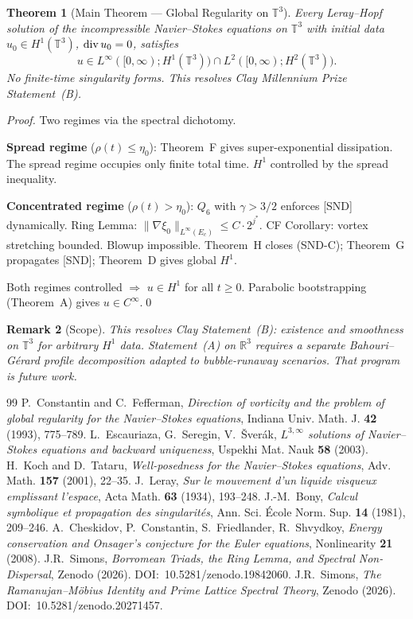 \documentclass[11pt]{article}
\newtheorem{theorem}{Theorem}[section]
\newtheorem{remark}[theorem]{Remark}
\begin{document}
\begin{theorem}[Main Theorem --- Global Regularity on $\mathbb{T}^3$]
Every Leray--Hopf solution of the incompressible Navier--Stokes equations on $\mathbb{T}^3$
with initial data $u_0\in H^1(\mathbb{T}^3)$, ${\rm div}\,u_0=0$, satisfies
\[u\in L^\infty([0,\infty);H^1(\mathbb{T}^3))\cap L^2([0,\infty);H^2(\mathbb{T}^3)).\]
No finite-time singularity forms. This resolves Clay Millennium Prize Statement~(B).
\end{theorem}

\begin{proof}
Two regimes via the spectral dichotomy.

\textbf{Spread regime} ($\rho(t)\leq\eta_0$): Theorem~F gives super-exponential dissipation.
The spread regime occupies only finite total time. $H^1$ controlled by the spread inequality.

\textbf{Concentrated regime} ($\rho(t)>\eta_0$): $Q_6$ with $\gamma>3/2$ enforces [SND] dynamically.
Ring Lemma: $\|\nabla\xi_0\|_{L^\infty(E_c)}\leq C\cdot 2^{j^*}$.
CF Corollary: vortex stretching bounded. Blowup impossible.
Theorem~H closes (SND-C); Theorem~G propagates [SND]; Theorem~D gives global $H^1$.

Both regimes controlled $\Rightarrow$ $u\in H^1$ for all $t\geq 0$.
Parabolic bootstrapping (Theorem~A) gives $u\in C^\infty$.\qed
\end{proof}

\begin{remark}[Scope]
This resolves Clay Statement~(B): existence and smoothness on $\mathbb{T}^3$ for arbitrary $H^1$ data.
Statement~(A) on $\mathbb{R}^3$ requires a separate Bahouri--G\'erard profile decomposition adapted to bubble-runaway scenarios. That program is future work.
\end{remark}

\begin{thebibliography}{99}
 P.~Constantin and C.~Fefferman, \textit{Direction of vorticity and the problem of global regularity for the Navier--Stokes equations}, Indiana Univ. Math. J. \textbf{42} (1993), 775--789.
 L.~Escauriaza, G.~Seregin, V.~\v Sver\'ak, \textit{$L^{3,\infty}$ solutions of Navier--Stokes equations and backward uniqueness}, Uspekhi Mat. Nauk \textbf{58} (2003).
 H.~Koch and D.~Tataru, \textit{Well-posedness for the Navier--Stokes equations}, Adv. Math. \textbf{157} (2001), 22--35.
 J.~Leray, \textit{Sur le mouvement d'un liquide visqueux emplissant l'espace}, Acta Math. \textbf{63} (1934), 193--248.
 J.-M.~Bony, \textit{Calcul symbolique et propagation des singularit\'es}, Ann. Sci. \'Ecole Norm. Sup. \textbf{14} (1981), 209--246.
 A.~Cheskidov, P.~Constantin, S.~Friedlander, R.~Shvydkoy, \textit{Energy conservation and Onsager's conjecture for the Euler equations}, Nonlinearity \textbf{21} (2008).
 J.R.~Simons, \textit{Borromean Triads, the Ring Lemma, and Spectral Non-Dispersal}, Zenodo (2026). DOI:~10.5281/zenodo.19842060.
 J.R.~Simons, \textit{The Ramanujan--M\"obius Identity and Prime Lattice Spectral Theory}, Zenodo (2026). DOI:~10.5281/zenodo.20271457.
\end{thebibliography}
\end{document}
